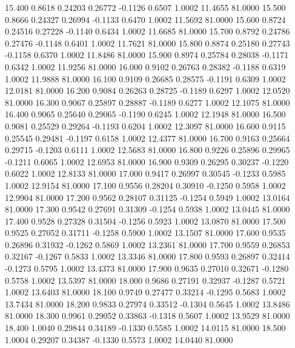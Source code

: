   15.400   0.8618   0.24203   0.26772  -0.1126   0.6507   1.0002  11.4655  81.0000
  15.500   0.8666   0.24327   0.26994  -0.1133   0.6470   1.0002  11.5692  81.0000
  15.600   0.8724   0.24516   0.27228  -0.1140   0.6434   1.0002  11.6685  81.0000
  15.700   0.8792   0.24786   0.27476  -0.1148   0.6401   1.0002  11.7621  81.0000
  15.800   0.8874   0.25180   0.27743  -0.1158   0.6370   1.0002  11.8486  81.0000
  15.900   0.8974   0.25784   0.28038  -0.1171   0.6342   1.0002  11.9256  81.0000
  16.000   0.9102   0.26763   0.28382  -0.1188   0.6319   1.0002  11.9888  81.0000
  16.100   0.9109   0.26685   0.28575  -0.1191   0.6309   1.0002  12.0181  81.0000
  16.200   0.9084   0.26263   0.28725  -0.1189   0.6297   1.0002  12.0520  81.0000
  16.300   0.9067   0.25897   0.28887  -0.1189   0.6277   1.0002  12.1075  81.0000
  16.400   0.9065   0.25640   0.29065  -0.1190   0.6245   1.0002  12.1948  81.0000
  16.500   0.9081   0.25529   0.29264  -0.1193   0.6204   1.0002  12.3097  81.0000
  16.600   0.9115   0.25545   0.29481  -0.1197   0.6158   1.0002  12.4377  81.0000
  16.700   0.9163   0.25664   0.29715  -0.1203   0.6111   1.0002  12.5683  81.0000
  16.800   0.9226   0.25896   0.29965  -0.1211   0.6065   1.0002  12.6953  81.0000
  16.900   0.9309   0.26295   0.30237  -0.1220   0.6022   1.0002  12.8133  81.0000
  17.000   0.9417   0.26997   0.30545  -0.1233   0.5985   1.0002  12.9154  81.0000
  17.100   0.9556   0.28204   0.30910  -0.1250   0.5958   1.0002  12.9904  81.0000
  17.200   0.9562   0.28107   0.31125  -0.1254   0.5949   1.0002  13.0164  81.0000
  17.300   0.9542   0.27691   0.31309  -0.1254   0.5938   1.0002  13.0445  81.0000
  17.400   0.9528   0.27328   0.31504  -0.1256   0.5923   1.0002  13.0870  81.0000
  17.500   0.9525   0.27052   0.31711  -0.1258   0.5900   1.0002  13.1507  81.0000
  17.600   0.9535   0.26896   0.31932  -0.1262   0.5869   1.0002  13.2361  81.0000
  17.700   0.9559   0.26853   0.32167  -0.1267   0.5833   1.0002  13.3346  81.0000
  17.800   0.9593   0.26897   0.32414  -0.1273   0.5795   1.0002  13.4373  81.0000
  17.900   0.9635   0.27010   0.32671  -0.1280   0.5758   1.0002  13.5397  81.0000
  18.000   0.9686   0.27191   0.32937  -0.1287   0.5721   1.0002  13.6403  81.0000
  18.100   0.9749   0.27477   0.33214  -0.1295   0.5683   1.0002  13.7434  81.0000
  18.200   0.9833   0.27974   0.33512  -0.1304   0.5645   1.0002  13.8486  81.0000
  18.300   0.9961   0.29052   0.33863  -0.1318   0.5607   1.0002  13.9529  81.0000
  18.400   1.0040   0.29844   0.34189  -0.1330   0.5585   1.0002  14.0115  81.0000
  18.500   1.0004   0.29207   0.34387  -0.1330   0.5573   1.0002  14.0440  81.0000

